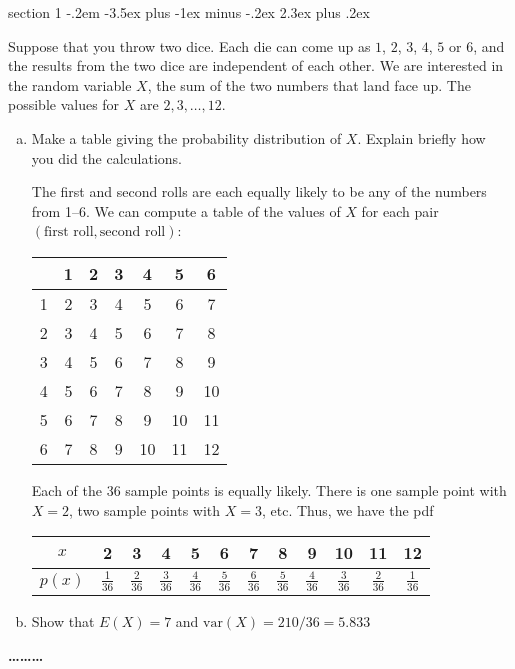\documentclass[answers,11pt]{exam}
\makeatletter
\newenvironment{problem}{\@startsection
       {section}
       {1}
       {-.2em}
       {-3.5ex plus -1ex minus -.2ex}
       {2.3ex plus .2ex}
       {\pagebreak[3]%
       \large\bf\noindent{Problem }
       }
       }
       {%
       \begin{center}\large\bf \ldots\ldots\ldots\end{center}}
\makeatother
\begin{document}
\newpage
\begin{problem}{}
 
Suppose that you throw two dice. Each die can come up as $1$, $2$, $3$, $4$,
$5$ or $6$, and the results from the two dice are independent of each other.
We are interested in the random variable $X$, the sum of the two numbers that
land face up. The possible values for $X$ are $2, 3, \dotsc, 12$. 
 
\begin{enumerate}[(a)]

\item Make a table giving the probability distribution of $X$.  Explain
briefly how you did the calculations. 
\begin{solution}
The first and second rolls are each equally likely to be any of the numbers
from 1--6.  We can compute a table of the values of $X$ for each pair
$(\text{first roll}, \text{second roll})$:

\begin{center}
\begin{tabular}{c|cccccc}
  & 1 & 2 & 3 &  4 &  5 &  6 \\
\hline
1 & 2 & 3 & 4 &  5 &  6 &  7 \\
2 & 3 & 4 & 5 &  6 &  7 &  8 \\
3 & 4 & 5 & 6 &  7 &  8 &  9 \\
4 & 5 & 6 & 7 &  8 &  9 & 10 \\
5 & 6 & 7 & 8 &  9 & 10 & 11 \\
6 & 7 & 8 & 9 & 10 & 11 & 12 \\
\end{tabular}
\end{center}

Each of the 36 sample points is equally likely.  There is one sample point
with $X = 2$, two sample points with $X = 3$, etc.  Thus, we have the pdf

\begin{center}
\begin{tabular}{c|ccccccccccc}
$x$ & 2 & 3 & 4 & 5 & 6 & 7 & 8 & 9 & 10 & 11 & 12 \\
\hline
$p(x)$
& $\frac{1}{36}$
& $\frac{2}{36}$
& $\frac{3}{36}$
& $\frac{4}{36}$
& $\frac{5}{36}$
& $\frac{6}{36}$
& $\frac{5}{36}$
& $\frac{4}{36}$
& $\frac{3}{36}$
& $\frac{2}{36}$
& $\frac{1}{36}$ \\
\end{tabular}
\end{center}
\end{solution}
\item Show that $E(X) = 7$ and $\mathrm{var}(X) = 210/36 = 5.833$


\end{enumerate}
\end{problem}
\end{document}
